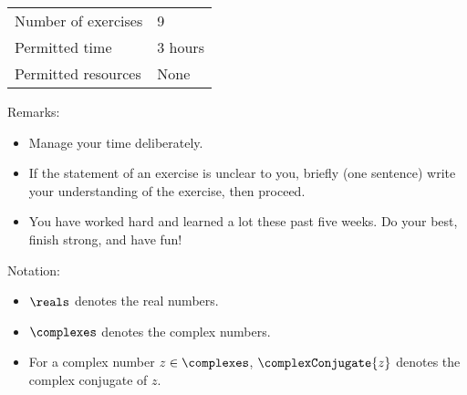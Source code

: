 \begin{center}
\begin{tabular}{l@{ : }l}
Number of exercises	&	9		\\
Permitted time		&	3 hours	\\
Permitted resources	&	None
\end{tabular}
\end{center}
\vspace{.25in}
\noindent{}Remarks:
\begin{itemize}
\item Manage your time deliberately.
\item If the statement of an exercise is unclear to you, briefly (one sentence) write your understanding of the exercise, then proceed.
\item You have worked hard and learned a lot these past five weeks. Do your best, finish strong, and have fun!
\end{itemize}
\noindent{}Notation:
\begin{itemize}
\item $\reals$ denotes the real numbers.
\item $\complexes$ denotes the complex numbers.
\item For a complex number $z \in \complexes$, $\complexConjugate{z}$ denotes the complex conjugate of $z$.
\end{itemize}